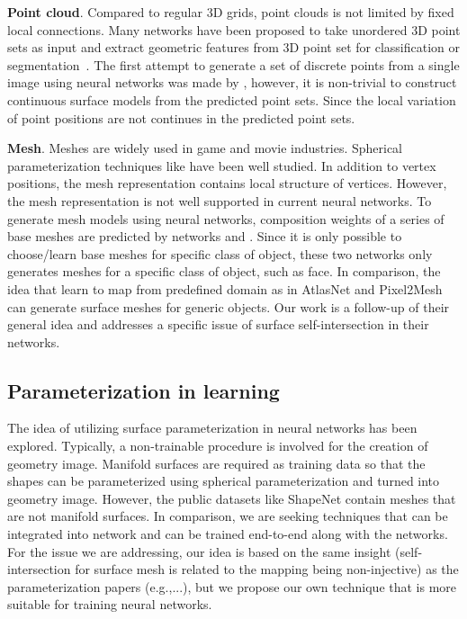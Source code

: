 \noindent\textbf{Point cloud}. 
Compared to regular 3D grids, point clouds is not limited by fixed local connections.
Many networks have been proposed to take unordered 3D point sets as input and extract geometric features from 3D point set for classification or segmentation~\cite{pointnet,NIPS2017_7095,pointcnn}.
%
The first attempt to generate a set of discrete points from a single image using neural networks was made by \cite{PSGN}, however, it is non-trivial to construct continuous surface models from the predicted point sets. Since the local variation of point positions are not continues in the predicted point sets.

\noindent\textbf{Mesh}.
Meshes are widely used in game and movie industries. Spherical parameterization techniques like \cite{HuAHSP2018} have been well studied.
In addition to vertex positions, the mesh representation contains local structure of vertices. 
However, the mesh representation is not well supported in current neural networks.
% 
To generate mesh models using neural networks, composition weights of a series of base meshes are predicted by networks \cite{img2mesh} and \cite{endface}. %
Since it is only possible to choose/learn base meshes for specific class of object, these two networks only generates meshes for a specific class of object, such as face.
%
In comparison, the idea that learn to map from predefined domain as in AtlasNet \cite{atlasnet} and Pixel2Mesh\cite{pixel2mesh} can generate surface meshes for generic objects. Our work is a follow-up of their general idea and addresses a specific issue of surface self-intersection in their networks.

\subsection{Parameterization in learning}
The idea of utilizing surface parameterization in neural networks has been explored\cite{surfnet,geoimg}. 
Typically, a non-trainable procedure is involved for the creation of geometry image. 
Manifold surfaces are required as training data so that the shapes can be parameterized using spherical parameterization and turned into geometry image. However, the public datasets like ShapeNet\cite{shapenetdata} contain meshes that are not manifold surfaces. 
In comparison, we are seeking techniques that can be integrated into network and can be trained end-to-end along with the networks. For the issue we are addressing, our idea is based on the same insight (self-intersection for surface mesh is related to the mapping being non-injective) as the parameterization papers (e.g.\cite{provableplanarmapping,lifted_bijection,freeboundary,boundeddistortion,Liu_PP_2018},...), but we propose our own technique that is more suitable for training neural networks. 

